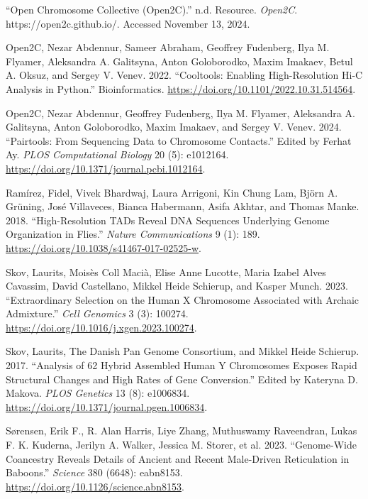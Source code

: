 \documentclass[
  11pt,
  a4paper,
]{scrbook}
\newlength{\cslhangindent}
\newenvironment{CSLReferences}[2] %
 {\begin{list}{}{%
  \setlength{\itemindent}{0pt}
  \setlength{\leftmargin}{0pt}
  \setlength{\parsep}{0pt}
  \ifodd #1
   \setlength{\leftmargin}{\cslhangindent}
   \setlength{\itemindent}{-1\cslhangindent}
  \fi
  \setlength{\itemsep}{#2\baselineskip}}}
 {\end{list}}
\let\oldemph\emph
\renewcommand\emph[1]{\oldemph{\color{gray}#1}}
\begin{document}
\begin{CSLReferences}{1}{0}
{``Open {Chromosome Collective} ({Open2C}).''} n.d. Resource.
\emph{Open2C}. https://open2c.github.io/. Accessed November 13, 2024.

Open2C, Nezar Abdennur, Sameer Abraham, Geoffrey Fudenberg, Ilya M.
Flyamer, Aleksandra A. Galitsyna, Anton Goloborodko, Maxim Imakaev,
Betul A. Oksuz, and Sergey V. Venev. 2022. {``Cooltools: Enabling
High-Resolution {Hi-C} Analysis in {Python}.''} Bioinformatics.
\url{https://doi.org/10.1101/2022.10.31.514564}.

Open2C, Nezar Abdennur, Geoffrey Fudenberg, Ilya M. Flyamer, Aleksandra
A. Galitsyna, Anton Goloborodko, Maxim Imakaev, and Sergey V. Venev.
2024. {``Pairtools: {From} Sequencing Data to Chromosome Contacts.''}
Edited by Ferhat Ay. \emph{PLOS Computational Biology} 20 (5): e1012164.
\url{https://doi.org/10.1371/journal.pcbi.1012164}.

Ramírez, Fidel, Vivek Bhardwaj, Laura Arrigoni, Kin Chung Lam, Björn A.
Grüning, José Villaveces, Bianca Habermann, Asifa Akhtar, and Thomas
Manke. 2018. {``High-Resolution {TADs} Reveal {DNA} Sequences Underlying
Genome Organization in Flies.''} \emph{Nature Communications} 9 (1):
189. \url{https://doi.org/10.1038/s41467-017-02525-w}.

Skov, Laurits, Moisès Coll Macià, Elise Anne Lucotte, Maria Izabel Alves
Cavassim, David Castellano, Mikkel Heide Schierup, and Kasper Munch.
2023. {``Extraordinary Selection on the Human {X} Chromosome Associated
with Archaic Admixture.''} \emph{Cell Genomics} 3 (3): 100274.
\url{https://doi.org/10.1016/j.xgen.2023.100274}.

Skov, Laurits, The Danish Pan Genome Consortium, and Mikkel Heide
Schierup. 2017. {``Analysis of 62 Hybrid Assembled Human {Y} Chromosomes
Exposes Rapid Structural Changes and High Rates of Gene Conversion.''}
Edited by Kateryna D. Makova. \emph{PLOS Genetics} 13 (8): e1006834.
\url{https://doi.org/10.1371/journal.pgen.1006834}.

Sørensen, Erik F., R. Alan Harris, Liye Zhang, Muthuswamy Raveendran,
Lukas F. K. Kuderna, Jerilyn A. Walker, Jessica M. Storer, et al. 2023.
{``Genome-Wide Coancestry Reveals Details of Ancient and Recent
Male-Driven Reticulation in Baboons.''} \emph{Science} 380 (6648):
eabn8153. \url{https://doi.org/10.1126/science.abn8153}.


\end{CSLReferences}
\end{document}
